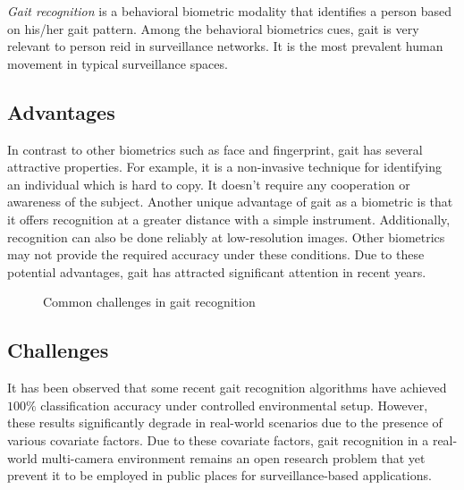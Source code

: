 \textit{Gait recognition} is a behavioral biometric modality that identifies a person based on his/her gait pattern. Among the behavioral biometrics cues, gait is very relevant to person \gls{reid} in surveillance networks. It is the most prevalent human movement in typical surveillance spaces. 


\subsection{Advantages}
In contrast to other biometrics such as face and fingerprint, gait has several attractive properties. For example, it is a non-invasive technique for identifying an individual which is hard to copy. It doesn't require any cooperation or awareness of the subject. Another unique advantage of gait as a biometric is that it offers recognition at a greater distance with a simple instrument. Additionally, recognition can also be done reliably at low-resolution images. Other biometrics may not provide the required accuracy under these conditions. Due to these potential advantages, gait has attracted significant attention in recent years.

\begin{figure}
	\caption[A basic topology of person re-identification in a multi-camera network environment]
	{Common challenges in gait recognition \label{fig:gait_challenges}}
\end{figure}



\subsection{Challenges}
It has been observed that some recent gait recognition algorithms have achieved $100\%$ classification accuracy under controlled environmental setup. However, these results significantly degrade in real-world scenarios due to the presence of various covariate factors. Due to these covariate factors, gait recognition in a real-world multi-camera environment remains an open research problem that yet prevent it to be employed in public places for surveillance-based applications. 

